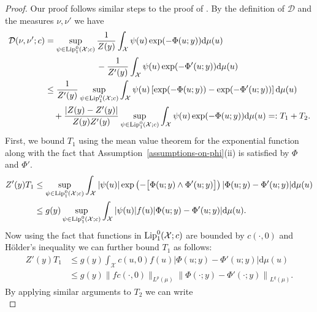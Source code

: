 \documentclass[final]{siamart171218}
\newcommand{\mcl}{\mathcal}
\newcommand{\dd}{\text{d}}
\newcommand{\Lip}{{\rm Lip}_1}
\newcommand{\mX}{\mcl{X}}
\newcommand{\cc}{c}
\newcommand{\K}{\mathcal{D}}
\begin{document}
\begin{proof}
  Our proof follows similar steps to the proof of \cite[Thm.~14]{sprungk}.  
  By the definition of $\K$ and the measures $\nu, \nu'$ we have 
  \begin{equation*}
    \begin{aligned}
    \K( \nu, \nu'; \cc) & = \sup_{\psi \in \Lip^0(\mX; \cc)}
    \frac{1}{Z(y)} \int_\mX \psi(u) \exp( - \Phi(u;y)) \dd \mu(u) \\
    & \qquad \qquad  \qquad -  \frac{1}{Z'(y)} \int_\mX \psi(u) \exp( - \Phi'(u;y)) \dd \mu(u) \\
    & \le \frac{1}{Z'(y)}  \sup_{\psi \in \Lip^0(\mX; \cc)} \int_\mX \psi(u)
    \left[ \exp(-\Phi(u; y)) - \exp(- \Phi'(u;y) ) \right] \dd \mu(u)  \\
    & \quad  + \frac{| Z(y) - Z'(y)|}{Z(y) Z'(y)} \sup_{\psi \in \Lip^0(\mX; \cc)} \int_\mX \psi(u) \exp( - \Phi(u;y)) \dd \mu(u)
    =: T_1 + T_2.   
   \end{aligned}
 \end{equation*}
 First, we bound $T_1$ using the mean value theorem for the exponential function
 along with the fact that Assumption~\ref{assumptions-on-phi}(ii) is satisfied by
 $\Phi$ and $\Phi'$. 
 \begin{equation*}
   \begin{aligned}
     Z'(y) T_1
     & \le \sup_{\psi \in \Lip^0(\mX; \cc)}
     \int_\mX | \psi (u) | \exp \left( - \big[ \Phi(u;y) \wedge \Phi'(u;y) \big] \right)
     | \Phi(u;y) - \Phi'(u;y) | \dd \mu(u) \\
     & \le g(y)
        \sup_{\psi \in \Lip^0(\mX; \cc)} \int_\mX |\psi (u)| f( u)  | \Phi(u;y) - \Phi'(u;y) | \dd \mu(u).
   \end{aligned}
 \end{equation*}
 Now using the fact that functions in $\Lip^0(\mX; \cc)$ are bounded by $\cc(\cdot , 0)$ and
 H{\"o}lder's inequality we can further bound $T_1$ as follows:
 \begin{equation*}
   \begin{aligned}
     Z'(y)  T_1  &  \le  g(y)
     \int_\mX \cc(u, 0) f(u) | \Phi(u;y) - \Phi'(u;y) | \dd \mu(u) \\
     &\le g(y) \| f \cc(\cdot, 0) \|_{L^p(\mu)} 
     \left\| \Phi(\cdot ;y) - \Phi'(\cdot; y) \right\|_{L^q(\mu)}.  
   \end{aligned}
 \end{equation*}
 By applying similar arguments to $T_2$ we can write
 \begin{equation*}

\end{equation*}
\end{proof}
\end{document}
